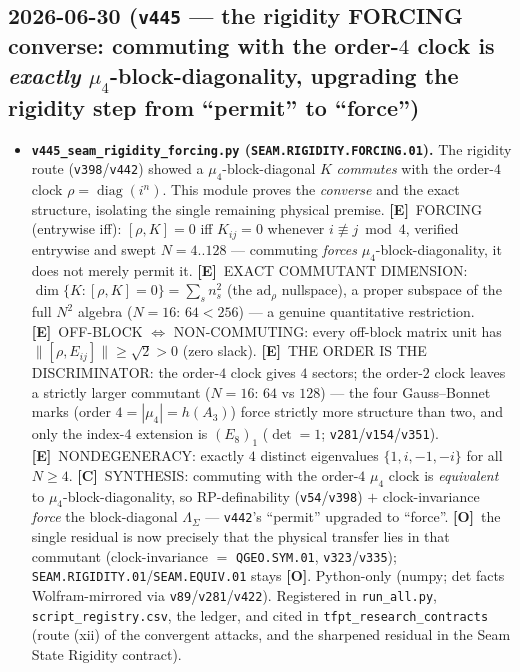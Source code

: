 \documentclass[11pt]{article}
\providecommand{\mE}{\textbf{[E]}}\providecommand{\mC}{\textbf{[C]}}
\providecommand{\mO}{\textbf{[O]}}\providecommand{\mX}{\textbf{[X]}}
\begin{document}
\subsection*{2026-06-30 (\texttt{v445} --- the rigidity FORCING converse: commuting with the order-$4$ clock is \emph{exactly} $\mu_4$-block-diagonality, upgrading the rigidity step from ``permit'' to ``force'')}
\begin{itemize}
\item \textbf{\texttt{v445\_seam\_rigidity\_forcing.py} (\texttt{SEAM.RIGIDITY.FORCING.01}).} The rigidity route
(\texttt{v398}/\texttt{v442}) showed a $\mu_4$-block-diagonal $K$ \emph{commutes} with the order-$4$ clock
$\rho{=}\operatorname{diag}(i^n)$. This module proves the \emph{converse} and the exact structure, isolating the
single remaining physical premise. \mE\ FORCING (entrywise iff): $[\rho,K]{=}0$ iff $K_{ij}{=}0$ whenever
$i{\not\equiv}j\bmod4$, verified entrywise and swept $N{=}4..128$ --- commuting \emph{forces}
$\mu_4$-block-diagonality, it does not merely permit it. \mE\ EXACT COMMUTANT DIMENSION:
$\dim\{K:[\rho,K]{=}0\}{=}\sum_s n_s^2$ (the $\mathrm{ad}_\rho$ nullspace), a proper subspace of the full $N^2$
algebra ($N{=}16$: $64{<}256$) --- a genuine quantitative restriction. \mE\ OFF-BLOCK $\Leftrightarrow$
NON-COMMUTING: every off-block matrix unit has $\|[\rho,E_{ij}]\|{\ge}\sqrt2{>}0$ (zero slack). \mE\ THE ORDER IS
THE DISCRIMINATOR: the order-$4$ clock gives $4$ sectors; the order-$2$ clock leaves a strictly larger commutant
($N{=}16$: $64$ vs $128$) --- the four Gauss--Bonnet marks (order $4{=}|\mu_4|{=}h(A_3)$) force strictly more
structure than two, and only the index-$4$ extension is $(E_8)_1$ ($\det{=}1$; \texttt{v281}/\texttt{v154}/\texttt{v351}).
\mE\ NONDEGENERACY: exactly $4$ distinct eigenvalues $\{1,i,-1,-i\}$ for all $N{\ge}4$. \mC\ SYNTHESIS: commuting
with the order-$4$ $\mu_4$ clock is \emph{equivalent} to $\mu_4$-block-diagonality, so RP-definability
(\texttt{v54}/\texttt{v398}) $+$ clock-invariance \emph{force} the block-diagonal $\Lambda_\Sigma$ ---
\texttt{v442}'s ``permit'' upgraded to ``force''. \mO\ the single residual is now precisely that the physical
transfer lies in that commutant (clock-invariance $=$ \texttt{QGEO.SYM.01}, \texttt{v323}/\texttt{v335});
\texttt{SEAM.RIGIDITY.01}/\texttt{SEAM.EQUIV.01} stays \mO. Python-only (numpy; det facts Wolfram-mirrored via
\texttt{v89}/\texttt{v281}/\texttt{v422}). Registered in \texttt{run\_all.py}, \texttt{script\_registry.csv}, the
ledger, and cited in \texttt{tfpt\_research\_contracts} (route (xii) of the convergent attacks, and the sharpened
residual in the Seam State Rigidity contract).
\end{itemize}
\end{document}
